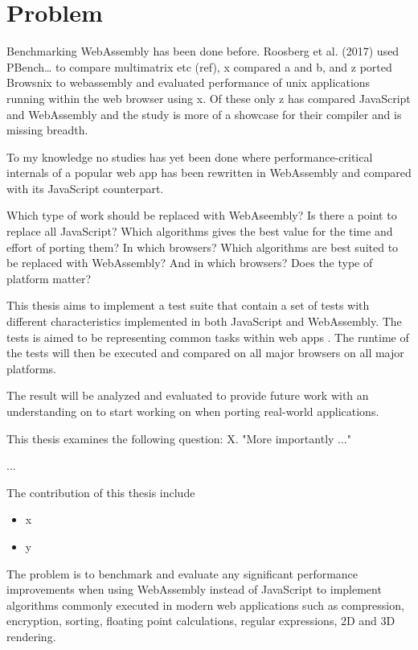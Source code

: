 \section{Problem}
\label{problem}

Benchmarking WebAssembly has been done before. Roosberg et al. (2017) used PBench… to compare multimatrix etc (ref), x compared a and b, and z ported Browsnix to webassembly and evaluated performance of unix applications running within the web browser using x. Of these only z has compared JavaScript and WebAssembly and the study is more of a showcase for their compiler and is missing breadth.

To my knowledge no studies has yet been done where performance-critical internals of a popular web app has been rewritten in WebAssembly and compared with its JavaScript counterpart. 

Which type of work should be replaced with WebAseembly? Is there a point to replace all JavaScript?
Which algorithms gives the best value for the time and effort of porting them? In which browsers?
Which algorithms are best suited to be replaced with WebAssembly? And in which browsers? Does the type of platform matter?

This thesis aims to implement a test suite that contain a set of tests with different characteristics implemented in both JavaScript and WebAssembly. The tests is aimed to be representing common tasks within web apps \parencite{WohlinRunesonHostOhlssonRegnellWesslen2012}.
The runtime of the tests will then be executed and compared on all major browsers on all major platforms.

The result will be analyzed and evaluated to provide future work with an understanding on to start working on when porting real-world applications.

This thesis examines the following question: X. "More importantly ..."

...

The contribution of this thesis include

\begin{itemize}
    \item x
    \item y
\end{itemize}





The problem is to benchmark and evaluate any significant performance improvements \parencite{HaasRossbergSchuffTitzerHolmanGohmanWagnerZakaiBastien2017,ReiserBlaser2017,Zakai2018} when using WebAssembly instead of JavaScript to implement algorithms commonly executed in modern web applications such as compression, encryption, sorting, floating point calculations, regular expressions, 2D and 3D rendering.

